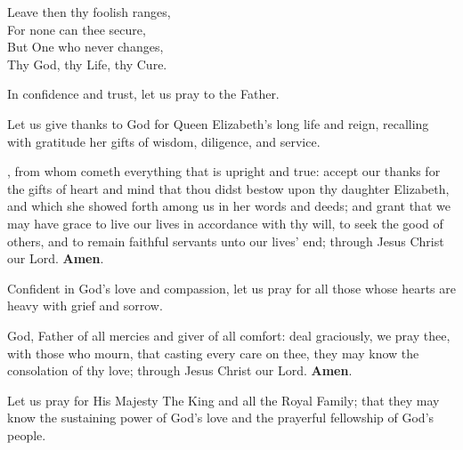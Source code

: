 \begin{center}
	Leave then thy foolish ranges,\\
For none can thee secure,\\
But One who never changes,\\
Thy God, thy Life, thy Cure.\\
\end{center}






In confidence and trust, let us pray to the Father.




Let us give thanks to God for Queen Elizabeth’s long life and reign, recalling with
gratitude her gifts of wisdom, diligence, and service.

, from whom cometh everything that is upright and true: accept our thanks
for the gifts of heart and mind that thou didst bestow upon thy daughter
Elizabeth, and which she showed forth among us in her words and deeds; and grant that
we may have grace to live our lives in accordance with thy will, to seek the good of
others, and to remain faithful servants unto our lives’ end; through Jesus Christ our
Lord. \textbf{Amen}.



Confident in God’s love and compassion, let us pray for all those whose hearts are heavy
with grief and sorrow.

 God, Father of all mercies and giver of all comfort: deal graciously,
we pray thee, with those who mourn, that casting every care on thee, they may
know the consolation of thy love; through Jesus Christ our Lord. \textbf{Amen}.



Let us pray for His Majesty The King and all the Royal Family; that they may know the
sustaining power of God’s love and the prayerful fellowship of God’s people.

